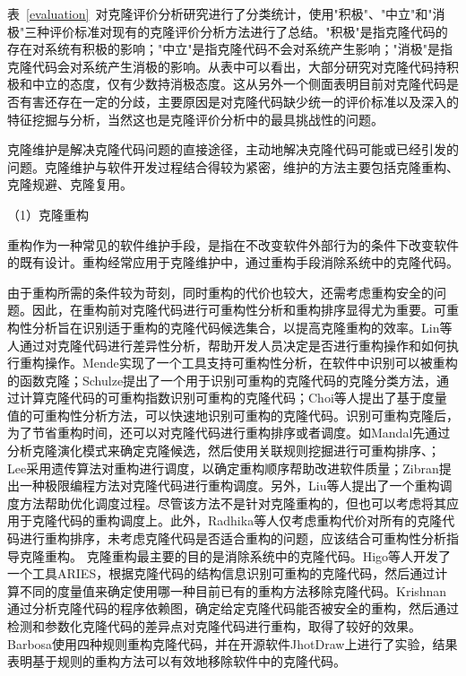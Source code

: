 表~\ref{evaluation}~对克隆评价分析研究进行了分类统计，使用"积极"、"中立"和"消极"三种评价标准对现有的克隆评价分析方法进行了总结。"积极"是指克隆代码的存在对系统有积极的影响；"中立"是指克隆代码不会对系统产生影响；"消极"是指克隆代码会对系统产生消极的影响。从表中可以看出，大部分研究对克隆代码持积极和中立的态度，仅有少数持消极态度。这从另外一个侧面表明目前对克隆代码是否有害还存在一定的分歧，主要原因是对克隆代码缺少统一的评价标准以及深入的特征挖掘与分析，当然这也是克隆评价分析中的最具挑战性的问题。



克隆维护是解决克隆代码问题的直接途径，主动地解决克隆代码可能或已经引发的问题。克隆维护与软件开发过程结合得较为紧密，维护的方法主要包括克隆重构、克隆规避、克隆复用。

（1）克隆重构

重构作为一种常见的软件维护手段，是指在不改变软件外部行为的条件下改变软件的既有设计\cite{kerievsky2006重构与模式}。重构经常应用于克隆维护中，通过重构手段消除系统中的克隆代码。

由于重构所需的条件较为苛刻，同时重构的代价也较大，还需考虑重构安全的问题。因此，在重构前对克隆代码进行可重构性分析和重构排序显得尤为重要。可重构性分析旨在识别适于重构的克隆代码候选集合，以提高克隆重构的效率。Lin等人通过对克隆代码进行差异性分析，帮助开发人员决定是否进行重构操作和如何执行重构操作\cite{lin2014detecting}。Mende实现了一个工具支持可重构性分析，在软件中识别可以被重构的函数克隆\cite{mende2009evaluation}；Schulze提出了一个用于识别可重构的克隆代码的克隆分类方法，通过计算克隆代码的可重构指数识别可重构的克隆代码\cite{schulze2008towards}；Choi等人提出了基于度量值的可重构性分析方法，可以快速地识别可重构的克隆代码\cite{choi2011extracting}。识别可重构克隆后，为了节省重构时间，还可以对克隆代码进行重构排序或者调度。如Mandal先通过分析克隆演化模式来确定克隆候选，然后使用关联规则挖掘进行可重构排序、\cite{mandal2014automatic}；Lee采用遗传算法对重构进行调度，以确定重构顺序帮助改进软件质量\cite{lee2011automated}；Zibran提出一种极限编程方法对克隆代码进行重构调度\cite{zibran2011constraint}。另外，Liu等人提出了一个重构调度方法帮助优化调度过程\cite{liu2012schedule}。尽管该方法不是针对克隆重构的，但也可以考虑将其应用于克隆代码的重构调度上。此外，Radhika等人仅考虑重构代价对所有的克隆代码进行重构排序，未考虑克隆代码是否适合重构的问题\cite{venkatasubramanyam2013prioritizing}，应该结合可重构性分析指导克隆重构。
克隆重构最主要的目的是消除系统中的克隆代码。Higo等人开发了一个工具ARIES，根据克隆代码的结构信息识别可重构的克隆代码，然后通过计算不同的度量值来确定使用哪一种目前已有的重构方法移除克隆代码\cite{higo2008metric}。Krishnan通过分析克隆代码的程序依赖图，确定给定克隆代码能否被安全的重构，然后通过检测和参数化克隆代码的差异点对克隆代码进行重构，取得了较好的效果\cite{krishnan2014unification}。Barbosa使用四种规则重构克隆代码，并在开源软件JhotDraw上进行了实验，结果表明基于规则的重构方法可以有效地移除软件中的克隆代码\cite{barbosa2013removing}。

